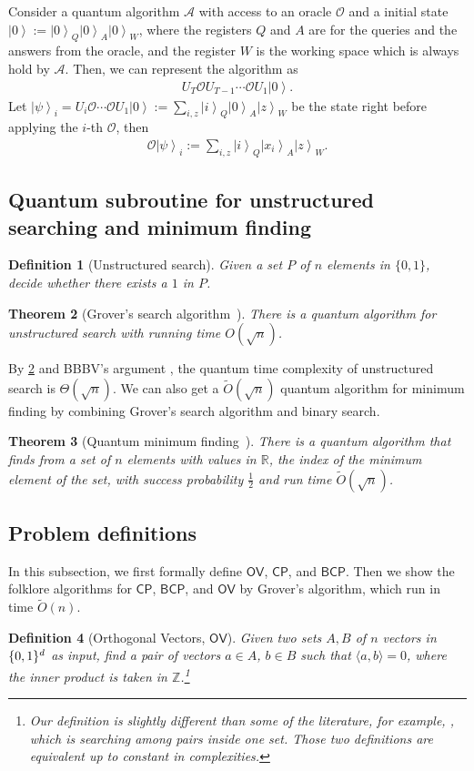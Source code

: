 \documentclass[10pt,a4paper]{article}
\newtheorem{theorem}{Theorem}
\newtheorem{definition}[theorem]{Definition}
\newcommand{\wt}{\widetilde}
\newcommand{\A}{\mathcal{A}}
\renewcommand{\tilde}{\wt}
\newcommand{\ip}[2]{\langle {#1} , {#2} \rangle}
\newcommand{\ket}[1]{\left| #1 \right\rangle}
\newcommand{\ora}{\mathcal{O}}
\newcommand{\CP}{\ensuremath{\mathsf{CP}}}
\newcommand{\OV}{\ensuremath{\mathsf{OV}}}
\newcommand{\BCP}{\ensuremath{\mathsf{BCP}}}
\begin{document}
Consider a quantum algorithm $\A$ with access to an oracle $\ora$ and a initial state $\ket{0}:= \ket{0}_{Q}\ket{0}_{A}\ket{0}_W$, where the registers $Q$ and $A$ are for the queries and the answers from the oracle, and the register $W$ is the working space which is always hold by $\A$.  Then, we can represent the algorithm as 
\begin{align}
    U_T \ora U_{T-1}\cdots\ora U_1  \ket{0}. 
\end{align}
Let $\ket{\psi}_i= U_i\ora \cdots \ora U_1\ket{0}:= \sum_{i,z} \ket{i}_Q\ket{0}_A\ket{z}_W$ be the state right before applying the $i$-th $\ora$, then
\begin{align}
    \ora \ket{\psi}_i:= \sum_{i,z} \ket{i}_Q\ket{x_i}_A\ket{z}_W.
\end{align}
\subsection{Quantum subroutine for unstructured searching and minimum finding}

\begin{definition}[Unstructured search]
Given a set $P$ of $n$ elements in $\{0,1\}$, decide whether there exists a $1$ in $P$. 
\end{definition}

\begin{theorem}[Grover's search algorithm~\cite{r24,r37}]\label{thm:grover_algo}
There is a quantum algorithm for unstructured search with running time $O(\sqrt{n})$.
\end{theorem}

By \cref{thm:grover_algo} and BBBV's argument \cite{r9}, the quantum time complexity of unstructured search is $\Theta(\sqrt{n})$. We can also get a $\tilde{O}(\sqrt{n})$ quantum algorithm for minimum finding by combining Grover's search algorithm and binary search.
\begin{theorem}[Quantum minimum finding~\cite{r23}]\label{thm:mim}
There is a quantum algorithm that finds from a set of $n$ elements with values in $\mathbb{R}$, the index of the minimum element of the set, with success probability $\frac{1}{2}$ and run time $\tilde{O}(\sqrt{n})$.
\end{theorem}

\subsection{Problem definitions}
In this subsection, we first formally define  $\OV$, $\CP$, and $\BCP$. Then we show the folklore algorithms for $\CP$, $\BCP$, and $\OV$ by Grover's algorithm, which run in time $\tilde{O}(n)$. 
\begin{definition}[Orthogonal Vectors, $\OV$]\label{def:OV}
Given two sets $A,B$ of $n$ vectors in $\mathbb \{0,1\}^d$ as input, find a pair of vectors $a\in A$, $b\in B$ such that
$\ip{a}{b}=0$, where the inner product is taken in $\mathbb{Z}$.\footnote{Our definition is slightly different than some of the literature, for example, \cite{r18}, which is searching among pairs inside one set. Those two definitions are equivalent up to constant in complexities.}
\end{definition}
\end{document}
